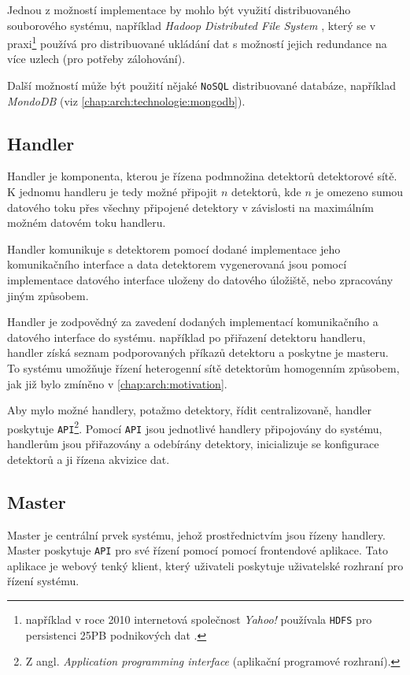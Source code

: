 Jednou z možností implementace by mohlo být využití distribuovaného souborového systému, například \textit{Hadoop Distributed File System} \cite{HDFS}, který se v praxi\footnote{například v roce 2010 internetová společnost \textit{Yahoo!} používala \texttt{HDFS} pro persistenci \unit{25}{PB} podnikových dat \cite{HDFS}.} používá pro distribuované ukládání dat s možností jejich redundance na více uzlech (pro potřeby zálohování). 

Další možností může být použití nějaké \texttt{NoSQL} distribuované databáze, například \textit{MondoDB} (viz \ref{chap:arch:technologie:mongodb}).

\subsection{Handler}
Handler je komponenta, kterou je řízena podmnožina detektorů detektorové sítě. K jednomu handleru je tedy možné připojit $n$ detektorů, kde $n$ je omezeno sumou datového toku přes všechny připojené detektory v závislosti na maximálním možném datovém toku handleru.

Handler komunikuje s detektorem pomocí dodané implementace jeho komunikačního interface a data detektorem vygenerovaná jsou pomocí implementace datového interface uloženy do datového úložiště, nebo zpracovány jiným způsobem.

Handler je zodpovědný za zavedení dodaných implementací komunikačního a datového interface do systému. například po přiřazení detektoru handleru, handler získá seznam podporovaných příkazů detektoru a poskytne je masteru. To systému umožňuje řízení heterogenní sítě detektorům homogenním způsobem, jak již bylo zmíněno v \ref{chap:arch:motivation}.

Aby mylo možné handlery, potažmo detektory, řídit centralizovaně, handler poskytuje \texttt{API}\footnote{Z angl. \textit{Application programming interface} (aplikační programové rozhraní).}. Pomocí \texttt{API} jsou jednotlivé handlery připojovány do systému, handlerům jsou přiřazovány a odebírány detektory, inicializuje se konfigurace detektorů a ji řízena akvizice dat.

\subsection{Master}
Master je centrální prvek systému, jehož prostřednictvím jsou řízeny handlery. Master poskytuje \texttt{API} pro své řízení pomocí pomocí frontendové aplikace. Tato aplikace je webový tenký klient, který uživateli poskytuje uživatelské rozhraní pro řízení systému.

